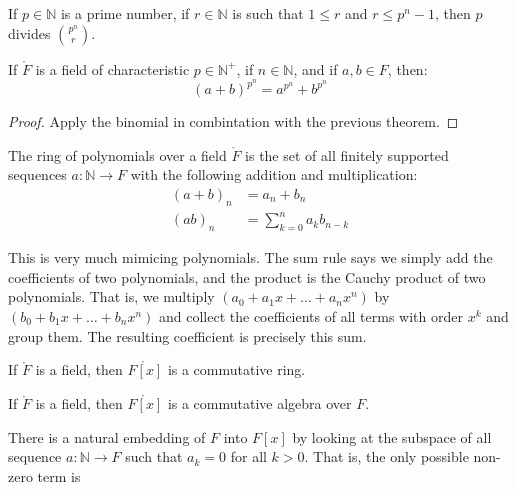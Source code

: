 \documentclass{article}                                                        %
\begin{document}
        \begin{theorem}
            If $p\in\mathbb{N}$ is a prime number, if $r\in\mathbb{N}$ is such
            that $1\leq{r}$ and $r\leq{p}^{n}-1$, then $p$ divides
            $\binom{p^{n}}{r}$.
        \end{theorem}
        \begin{theorem}
            If $\ring{F}$ is a field of characteristic $p\in\mathbb{N}^{+}$,
            if $n\in\mathbb{N}$, and if $a,b\in{F}$, then:
            \begin{equation}
                (a+b)^{p^{n}}=a^{p^{n}}+b^{p^{n}}
            \end{equation}
        \end{theorem}
        \begin{proof}
            Apply the binomial in combintation with the previous theorem.
        \end{proof}
        \begin{definition}
            The ring of polynomials over a field $\ring{F}$ is the set of all
            finitely supported sequences $a:\mathbb{N}\rightarrow{F}$ with the
            following addition and multiplication:
            \begin{align}
                (a+b)_{n}&=a_{n}+b_{n}\\
                (ab)_{n}&=\sum_{k=0}^{n}a_{k}b_{n-k}
            \end{align}
        \end{definition}
        This is very much mimicing polynomials. The sum rule says we simply add
        the coefficients of two polynomials, and the product is the Cauchy
        product of two polynomials. That is, we multiply
        $(a_{0}+a_{1}x+\dots+a_{n}x^{n})$ by $(b_{0}+b_{1}x+\dots+b_{n}x^{n})$
        and collect the coefficients of all terms with order $x^{k}$ and group
        them. The resulting coefficient is precisely this sum.
        \begin{theorem}
            If $\ring{F}$ is a field, then $\ring{F[x]}$ is a commutative ring.
        \end{theorem}
        \begin{theorem}
            If $\ring{F}$ is a field, then $\ring{F[x]}$ is a commutative
            algebra over $F$.
        \end{theorem}
        There is a natural embedding of $F$ into $F[x]$ by looking at the
        subspace of all sequence $a:\mathbb{N}\rightarrow{F}$ such that
        $a_{k}=0$ for all $k>0$. That is, the only possible non-zero term is
\end{document}
